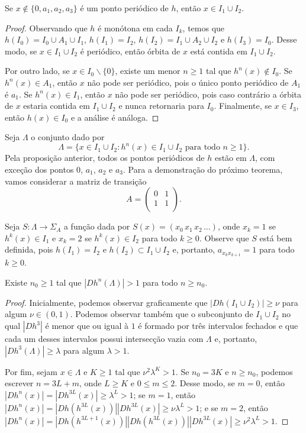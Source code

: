 \begin{proposition}
Se $x \notin \lbrace 0, a_1, a_2, a_3 \rbrace$ é um ponto periódico de $h$, então $x \in I_1 \cup I_2$.
\end{proposition}

\begin{proof}
Observando que $h$ é monótona em cada $I_k$, temos que $h(I_0) = I_0 \cup A_1 \cup I_1$, $h(I_1) = I_2$, $h(I_2) = I_1 \cup A_2 \cup I_2$ e $h(I_3) = I_0$. Desse modo, se $x \in I_1 \cup I_2$ é periódico, então órbita de $x$ está contida em $I_1 \cup I_2$.

Por outro lado, se $x \in I_0 \backslash \lbrace 0 \rbrace$, existe um menor $n \geq 1$ tal que $h^n(x) \notin I_0$. Se $h^n(x) \in A_1$, então $x$ não pode ser periódico, pois o único ponto periódico de $A_1$ é $a_1$.
Se $h^n(x) \in I_1$, então $x$ não pode ser periódico, pois caso contrário a órbita de $x$ estaria contida em $I_1 \cup I_2$ e nunca retornaria para $I_0$.
Finalmente, se $x \in I_3$, então $h(x) \in I_0$ e a análise é análoga.
\end{proof}

Seja $\Lambda$ o conjunto dado por
$$\Lambda = \lbrace x \in I_1 \cup I_2 : h^n(x) \in I_1 \cup I_2 \text{ para todo } n \geq 1 \rbrace.$$
Pela proposição anterior, todos os pontos periódicos de $h$ estão em $\Lambda$, com exceção dos pontos $0$, $a_1$, $a_2$ e $a_3$.
Para a demonstração do próximo teorema, vamos considerar a matriz de transição
$$A =
\begin{pmatrix}
0 & 1 \\
1 & 1 \\
\end{pmatrix}.$$

Seja $S: \Lambda \to \Sigma_A$ a função dada por $S(x) = (x_0 \, x_1 \, x_2 \, \dots)$, onde $x_k = 1$ se $h^k(x) \in I_1$ e $x_k = 2$ se $h^k(x) \in I_2$ para todo $k \geq 0$. Observe que $S$ está bem definida, pois $h(I_1) = I_2$ e $h(I_2) \subset I_1 \cup I_2$ e, portanto, $a_{x_k x_{k+1}} = 1$ para todo $k \geq 0$. 


\begin{lemma}
Existe $n_0 \geq 1$ tal que $|D h^n(\Lambda)| > 1$ para todo $n \geq n_0$.
\end{lemma}

\begin{proof}
Inicialmente, podemos observar graficamente que $|D h(I_1 \cup I_2)| \geq \nu$ para algum $\nu \in (0, 1)$.
Podemos observar também que o subconjunto de $I_1 \cup I_2$ no qual $|D h^3|$ é menor que ou igual à $1$ é formado por três intervalos fechados e que cada um desses intervalos possui intersecção vazia com $\Lambda$ e, portanto, $|D h^3(\Lambda)| \geq \lambda$ para algum $\lambda > 1$.

Por fim, sejam $x \in \Lambda$ e $K \geq 1$ tal que $\nu^2 \lambda^K > 1$. Se $n_0 = 3K$ e $n \geq n_0$, podemos escrever $n = 3L + m$, onde $L \geq K$ e $0 \leq m \leq 2$. Desse modo, se $m = 0$, então $ |D h^n(x)| = |D h^{3L}(x)|
\geq \lambda^L > 1$; se $m = 1$, então $|D h^n(x)| = |D h(h^{3L}(x))| |D h^{3L}(x)| \geq \nu \lambda^L > 1$; e se $m = 2$, então $|D h^n(x)| = |D h(h^{3L+1}(x))| |D h(h^{3L}(x))| |D h^{3L}(x)| \geq \nu^2 \lambda^L > 1$.
\end{proof}

